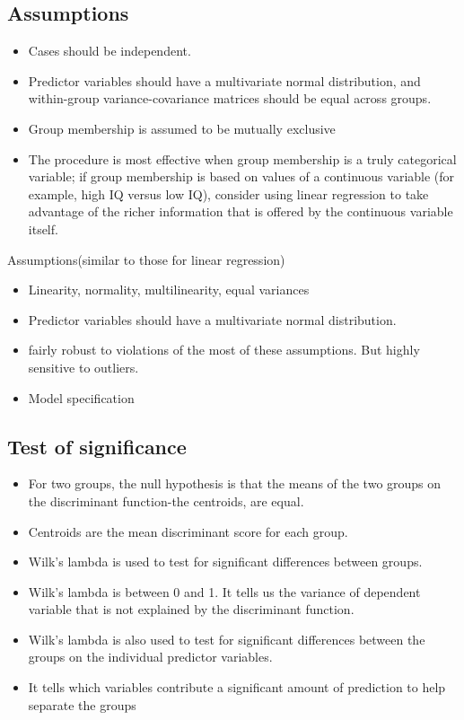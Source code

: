 \subsection{Assumptions }
\begin{itemize}
\item Cases should be independent.
\item Predictor variables should have a multivariate normal distribution, and within-group variance-covariance matrices should be equal across groups.
\item Group membership is assumed to be mutually exclusive
\item The procedure is most effective when group membership is a truly categorical variable; if group membership is based on 
values of a continuous variable (for example, high IQ versus low IQ), consider using linear regression to take advantage of the richer 
information that is offered by the continuous variable itself.
\end{itemize}

Assumptions(similar to those for linear regression)
\begin{itemize}
\item Linearity, normality, multilinearity, equal variances
\item Predictor variables should have a multivariate normal distribution.
\item fairly robust to violations of the most of these assumptions. But highly sensitive to outliers.
\item Model specification
\end{itemize}

\subsection{Test of significance}
\begin{itemize}
\item For two groups, the null hypothesis is that the means of the two groups on the discriminant function-the centroids, are equal.
\item Centroids are the mean discriminant score for each group.
\item Wilk’s lambda is used to test for significant differences between groups.
\item Wilk’s lambda is between 0 and 1. It tells us the variance of dependent variable that is not explained by the discriminant function.
\item Wilk’s lambda is also used to test for significant differences between the groups on the individual predictor variables.
\item It tells which variables contribute a significant amount of prediction to help separate the groups
\end{itemize}


